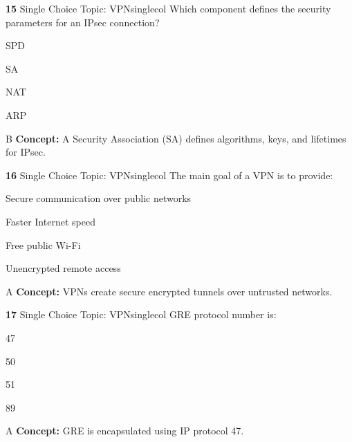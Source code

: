 \documentclass[10pt,a4paper]{article}
\begin{document}
\begin{qcard}{\color{white}\textbf{15} \hfill \small Single Choice \textbar{} Topic: VPN}{singlecol}
Which component defines the security parameters for an IPsec connection?

\begin{qoptions}
\item SPD
\item SA
\item NAT
\item ARP
\end{qoptions}
\begin{explainbox}{B}
\textbf{Concept:} A Security Association (SA) defines algorithms, keys, and lifetimes for IPsec.
\end{explainbox}
\end{qcard}

\begin{qcard}{\color{white}\textbf{16} \hfill \small Single Choice \textbar{} Topic: VPN}{singlecol}
The main goal of a VPN is to provide:

\begin{qoptions}
\item Secure communication over public networks
\item Faster Internet speed
\item Free public Wi-Fi
\item Unencrypted remote access
\end{qoptions}
\begin{explainbox}{A}
\textbf{Concept:} VPNs create secure encrypted tunnels over untrusted networks.
\end{explainbox}
\end{qcard}

\begin{qcard}{\color{white}\textbf{17} \hfill \small Single Choice \textbar{} Topic: VPN}{singlecol}
GRE protocol number is:

\begin{qoptions}
\item 47
\item 50
\item 51
\item 89
\end{qoptions}
\begin{explainbox}{A}
\textbf{Concept:} GRE is encapsulated using IP protocol 47.
\end{explainbox}
\end{qcard}
\end{document}
